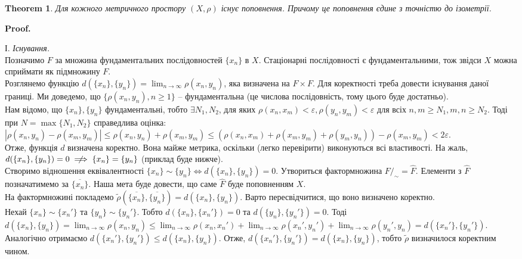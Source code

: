 \documentclass[a4paper, 10pt]{article}
\makeatletter
\theoremstyle{theoremdd}
\newtheorem{theorem}{Theorem}[subsection]
\theoremstyle{theoremdd}
\theoremstyle{theoremdd}
\theoremstyle{theoremdd}
\theoremstyle{theoremdd}
\theoremstyle{theoremdd}
\theoremstyle{theoremdd}
\theoremstyle{theoremdd}
\renewenvironment{proof}[1][Proof.\\]{\par
\pushQED{\hfill \qed}%
\normalfont \topsep6\p@\@plus6\p@\relax
\trivlist
\item\relax
{\bfseries
#1\@addpunct{.}}\hspace\labelsep\ignorespaces
}{%
\popQED\endtrivlist\@endpefalse
}
\makeatother
\begin{document}
\begin{theorem}
Для кожного метричного простору $(X,\rho)$ існує поповнення. Причому це поповнення єдине з точністю до ізометрії.
\end{theorem}

\begin{proof}
І. \textit{Існування.}\\
Позначимо $F$ за множина фундаментальних послідовностей $\{x_n\}$ в $X$. Стаціонарні послідовності є фундаментальними, тож звідси $X$ можна сприймати як підмножину $F$.\\
Розглянемо функцію $d(\{x_n\},\{y_n\}) = \displaystyle\lim_{n \to \infty} \rho(x_n,y_n)$, яка визначена на $F \times F$. Для коректності треба довести існування даної границі. Ми доведемо, що $\{ \rho(x_n,y_n), n \geq 1\}$ -- фундаментальна (це числова послідовність, тому цього буде достатньо).\\
Нам відомо, що $\{x_n\}, \{y_n\}$ фундаментальні, тобто $\exists N_1, N_2$, для яких $\rho(x_n,x_m) < \varepsilon, \rho(y_n,y_m) < \varepsilon$ для всіх $n,m \geq N_1, m,n \geq N_2$. Тоді при $N = \max \{N_1,N_2\}$ справедлива оцінка:\\
$|\rho(x_n,y_n) - \rho(x_m,y_m)| \leq \rho(x_n,y_n) + \rho(x_m,y_m) \leq (\rho(x_n,x_m) + \rho(x_m,y_m) + \rho(y_m,y_n)) - \rho(x_m,y_m) < 2 \varepsilon$.\\
Отже, функція $d$ визначена коректно. Вона майже метрика, оскільки (легко перевірити) виконуються всі властивості. На жаль, $d(\{x_n\},\{y_n\}) = 0 \centernot\implies \{x_n\} = \{y_n\}$ (приклад буде нижче).\\
Створимо відношення еквівалентності $\{x_n\} \sim \{y_n\} \iff d(\{x_n\},\{y_n\}) = 0$. Утвориться фактормножина $F/_{\sim} = \hat{F}$. Елементи з $\hat{F}$ позначатимемо за $\overline{\{x_n\}}$. Наша мета буде довести, що саме $\hat{F}$ буде поповненням $X$. \\
На фактормножині покладемо $\tilde{\rho}\left(\overline{\{x_n\}},\overline{\{y_n\}}\right) = d(\{x_n\},\{y_n\})$. Варто пересвідчитися, що воно визначено коректно.\\
Нехай $\{x_n\} \sim \{x_n'\}$ та $\{y_n\} \sim \{y_n'\}$. Тобто $d(\{x_n\},\{x_n'\}) = 0$ та $d(\{y_n\},\{y_n'\}) = 0$. Тоді\\
$d(\{x_n\},\{y_n\}) = \displaystyle\lim_{n \to \infty} \rho(x_n,y_n) \leq \lim_{n \to \infty} \rho(x_n,x_n') + \lim_{n \to \infty} \rho(x_n',y_n') + \lim_{n \to \infty} \rho(y_n',y_n) = d(\{x_n'\},\{y_n'\})$.\\
Аналогічно отримаємо $d(\{x_n'\},\{y_n'\}) \leq d(\{x_n\},\{y_n\})$. Отже, $d(\{x_n'\},\{y_n'\}) = d(\{x_n\},\{y_n\})$, тобто $\tilde{\rho}$ визначилося коректним чином.\\

\end{proof}
\end{document}
